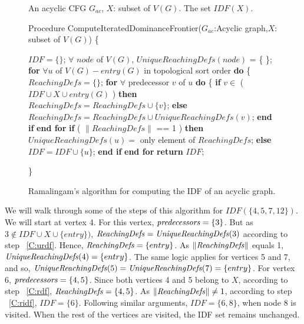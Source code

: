    \begin{figure}[!ht]
   \centering
  \begin{minipage}[t]{5in}
   An acyclic CFG $G_{ac}$, $X$: subset of $V(G)$.
   The set $IDF(X)$.
  \setcounter{linectr}{0}

    Procedure ComputeIteratedDominanceFrontier($G_{ac}$:Acyclic graph,$X$: subset of $V(G)$)
    \{
    \begin{code}

     $IDF = \{ \}$; 
     $\forall$ $node$ of $V(G)$, $UniqueReachingDefs(node)$ = \{ \};
     {\bf for} $\forall u$ of $V(G) - entry(G)$ in topological sort order {\bf do} \{ 
        $ReachingDefs = \{ \}$; 
        {\bf for} $\forall$ predecessor $v$ of $u$ {\bf do} \{ 
          {\bf if} $v \in$ ( $IDF \cup X \cup entry(G)$ ) {\bf then} 
             $ReachingDefs = ReachingDefs \cup \{v\}$; \label{C:rdf}
          {\bf else} 
             $ReachingDefs = ReachingDefs \cup UniqueReachingDefs(v)$; \label{C:urdf}
          {\bf end if} 
       {\bf end for} 
       {\bf if} ( $\|ReachingDefs\|$ == 1 ) {\bf then} \label{C:onerd}
          $UniqueReachingDefs(u) = $ only element of $ReachingDefs$; 
       {\bf else} 
           $IDF = IDF \cup \{u\}$; \label{C:ridf}
       {\bf end if}    
     {\bf end for} 
     {\bf return} $IDF$;   
     
    \end{code}
    \}
 
  \end{minipage}
  \caption{Ramalingam's algorithm for computing the IDF of an acyclic graph.}
  \label{F:ramaIDF}
  \end{figure}

    We will walk through some of the steps of this algorithm for $IDF(\{4,5,7,12\})$. We will start at
    vertex 4. For this vertex, ${\it predecessors} = \{3\}$. But as $3 \notin IDF \cup X \cup \{entry\})$, 
    ${\it ReachingDefs} = {\it UniqueReachingDefs}(3)$ according to step ~\ref{C:urdf}. Hence, 
    ${\it ReachingDefs} = \{entry\}$. As $\|{\it ReachingDefs}\|$ equals 1, 
    ${\it UniqueReachingDefs}(4) = \{entry\}$.
    The same logic applies for vertices 5 and 7, and so, 
    ${\it UniqueReachingDefs}(5) = {\it UniqueReachingDefs}(7) = \{entry\}$.
    For vertex 6, ${\it predecessors} = \{4,5\}$.
    Since both vertices 4 and 5 belong to $X$, according to step ~\ref{C:rdf}, 
    ${\it ReachingDefs} = \{4,5\}$.
    As $\|{\it ReachingDefs}\| \neq 1$, according to step ~\ref{C:ridf}, $IDF = \{6\}$.
    Following similar arguments, $IDF = \{6,8\}$, when node 8 is visited. When the rest of the vertices
    are visited, the IDF set remains unchanged. 

